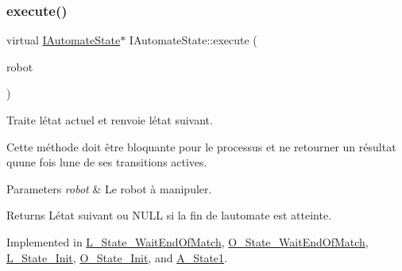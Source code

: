 \mbox{\label{classIAutomateState_a58bf3c2c5b55f7ba3fc1783fc36e102b}} 
\subsubsection{\texorpdfstring{execute()}{execute()}}
{\footnotesize\ttfamily virtual \hyperlink{classIAutomateState}{I\+Automate\+State}$\ast$ I\+Automate\+State\+::execute (\begin{DoxyParamCaption}\item[{\hyperlink{classRobot}{Robot} \&}]{robot }\end{DoxyParamCaption})\hspace{0.3cm}{\ttfamily [pure virtual]}}



Traite l\textquotesingle{}état actuel et renvoie l\textquotesingle{}état suivant. 

Cette méthode doit être bloquante pour le processus et ne retourner un résultat qu\textquotesingle{}une fois l\textquotesingle{}une de ses transitions actives.


\begin{DoxyParams}{Parameters}
{\em robot} & Le robot à manipuler. \\
\hline
\end{DoxyParams}
\begin{DoxyReturn}{Returns}
L\textquotesingle{}état suivant ou {\ttfamily N\+U\+LL} si la fin de l\textquotesingle{}automate est atteinte. 
\end{DoxyReturn}


Implemented in \hyperlink{classL__State__WaitEndOfMatch_a537e556e995b79725420de71b6ecce19}{L\+\_\+\+State\+\_\+\+Wait\+End\+Of\+Match}, \hyperlink{classO__State__WaitEndOfMatch_aa73613440b37c8dd42181e2e0265ae86}{O\+\_\+\+State\+\_\+\+Wait\+End\+Of\+Match}, \hyperlink{classL__State__Init_a444992513b49078f12eaa858f11591fe}{L\+\_\+\+State\+\_\+\+Init}, \hyperlink{classO__State__Init_abc19788b7457d1f819245dd28367fe91}{O\+\_\+\+State\+\_\+\+Init}, and \hyperlink{classA__State1_a351a7c94100ccc0dfb8a09e2037d4cc2}{A\+\_\+\+State1}.

\mbox{\label{classIAutomateState_a228fe704fd235a83cae36e5dd197c473}} 
